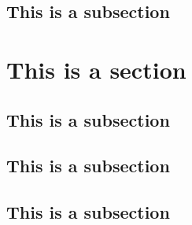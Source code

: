 \documentclass[11pt,oneside]{book}
\begin{document}
\subsection{This is a subsection}

\section{This is a section}

\subsection{This is a subsection}
\subsection{This is a subsection}
\subsection{This is a subsection}
% 
% 
% 
% 
% 
% 
\end{document}
